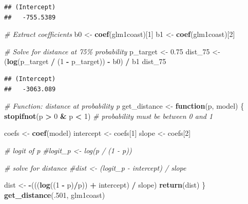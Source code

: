 \documentclass[
]{article}
\newenvironment{Shaded}{\begin{snugshade}}{\end{snugshade}}
\newcommand{\CommentTok}[1]{\textcolor[rgb]{0.56,0.35,0.01}{\textit{#1}}}
\newcommand{\ControlFlowTok}[1]{\textcolor[rgb]{0.13,0.29,0.53}{\textbf{#1}}}
\newcommand{\DecValTok}[1]{\textcolor[rgb]{0.00,0.00,0.81}{#1}}
\newcommand{\FloatTok}[1]{\textcolor[rgb]{0.00,0.00,0.81}{#1}}
\newcommand{\FunctionTok}[1]{\textcolor[rgb]{0.13,0.29,0.53}{\textbf{#1}}}
\newcommand{\NormalTok}[1]{#1}
\newcommand{\OtherTok}[1]{\textcolor[rgb]{0.56,0.35,0.01}{#1}}
\newcommand{\SpecialCharTok}[1]{\textcolor[rgb]{0.81,0.36,0.00}{\textbf{#1}}}
\begin{document}
\begin{verbatim}
## (Intercept) 
##   -755.5389
\end{verbatim}

\begin{Shaded}
\begin{Highlighting}[]
\CommentTok{\# Extract coefficients}
\NormalTok{b0 }\OtherTok{\textless{}{-}} \FunctionTok{coef}\NormalTok{(glm1coast)[}\DecValTok{1}\NormalTok{]}
\NormalTok{b1 }\OtherTok{\textless{}{-}} \FunctionTok{coef}\NormalTok{(glm1coast)[}\DecValTok{2}\NormalTok{]}

\CommentTok{\# Solve for distance at 75\% probability}
\NormalTok{p\_target }\OtherTok{\textless{}{-}} \FloatTok{0.75}
\NormalTok{dist\_75 }\OtherTok{\textless{}{-}}\NormalTok{ (}\FunctionTok{log}\NormalTok{(p\_target }\SpecialCharTok{/}\NormalTok{ (}\DecValTok{1} \SpecialCharTok{{-}}\NormalTok{ p\_target)) }\SpecialCharTok{{-}}\NormalTok{ b0) }\SpecialCharTok{/}\NormalTok{ b1}
\NormalTok{dist\_75}
\end{Highlighting}
\end{Shaded}

\begin{verbatim}
## (Intercept) 
##   -3063.089
\end{verbatim}

\begin{Shaded}
\begin{Highlighting}[]
\CommentTok{\# Function: distance at probability p}
\NormalTok{get\_distance }\OtherTok{\textless{}{-}} \ControlFlowTok{function}\NormalTok{(p, model) \{}
  \FunctionTok{stopifnot}\NormalTok{(p }\SpecialCharTok{\textgreater{}} \DecValTok{0} \SpecialCharTok{\&}\NormalTok{ p }\SpecialCharTok{\textless{}} \DecValTok{1}\NormalTok{)  }\CommentTok{\# probability must be between 0 and 1}
  
\NormalTok{  coefs }\OtherTok{\textless{}{-}} \FunctionTok{coef}\NormalTok{(model)}
\NormalTok{  intercept }\OtherTok{\textless{}{-}}\NormalTok{ coefs[}\DecValTok{1}\NormalTok{]}
\NormalTok{  slope }\OtherTok{\textless{}{-}}\NormalTok{ coefs[}\DecValTok{2}\NormalTok{]}
  
  \CommentTok{\# logit of p}
  \CommentTok{\#logit\_p \textless{}{-} log(p / (1 {-} p))}
  
  \CommentTok{\# solve for distance}
  \CommentTok{\#dist \textless{}{-} (logit\_p {-} intercept) / slope}
  
\NormalTok{  dist }\OtherTok{\textless{}{-}} \SpecialCharTok{{-}}\NormalTok{(((}\FunctionTok{log}\NormalTok{((}\DecValTok{1} \SpecialCharTok{{-}}\NormalTok{ p)}\SpecialCharTok{/}\NormalTok{p)) }\SpecialCharTok{+}\NormalTok{ intercept) }\SpecialCharTok{/}\NormalTok{ slope)}
  \FunctionTok{return}\NormalTok{(dist)}
\NormalTok{\}}
                                                                                                                                                                                    \FunctionTok{get\_distance}\NormalTok{(.}\DecValTok{501}\NormalTok{, glm1coast)}
\end{Highlighting}
\end{Shaded}
\end{document}
